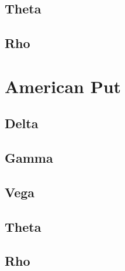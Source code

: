 \documentclass[12pt,a4paper]{article}
\begin{document}
\subsection{Theta}
\subsection{Rho}

\section{American Put}
\subsection{Delta}
\subsection{Gamma}
\subsection{Vega}
\subsection{Theta}
\subsection{Rho}
\end{document}
